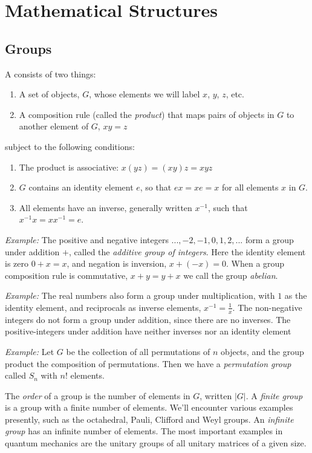 

\clearpage

\section{Mathematical Structures}

\subsection{Groups}
 A  consists of two things:
 \begin{enumerate}
\item A set of objects, $G$, whose elements we will label $x$, $y$, $z$, etc.
\item A composition rule (called the {\sl product}) that maps pairs of objects in $G$ to another element of $G$, $xy=z$
\end{enumerate}
subject to the following conditions:
\begin{enumerate}
\item The product is associative: $x(yz)= (xy)z= xyz$
\item $G$ contains an identity element $e$, so that $ex=xe=x$ for all elements $x$ in $G$.
\item All elements have an inverse, generally written $x^{-1}$, such that $x^{-1}x = x x^{-1} = e$.
\end{enumerate}

{\sl Example:} The positive and negative integers $..., -2, -1, 0, 1, 2, ...$ form a group under addition $+$, called the {\sl additive group of integers}. Here the identity element is zero $0+x=x$, and negation is inversion, $x+(-x) = 0$. When a group composition rule is commutative, $x+y = y+x$ we call the group {\sl abelian}.

{\sl Example:} The real numbers also form a group under multiplication, with $1$ as the identity element, and reciprocals as inverse elements, $x^{-1} = \tfrac{1}{x}$.
%
The non-negative integers do not form a group under addition, since there are no inverses. The positive-integers under addition have neither inverses nor an identity element

{\sl Example:} Let $G$ be the collection of all permutations of $n$ objects, and the group product the composition of permutations. Then we have a {\sl permutation group} called $S_n$ with $n!$ elements.
 
The {\sl order} of a group is the number of elements in $G$, written $|G|$. A {\sl finite group} is a group with a finite number of elements. We'll encounter various examples presently, such as the octahedral, Pauli, Clifford and Weyl groups. An {\sl infinite group} has an infinite number of elements. The most important examples in quantum mechanics are the unitary groups of all unitary matrices of a given size. 

